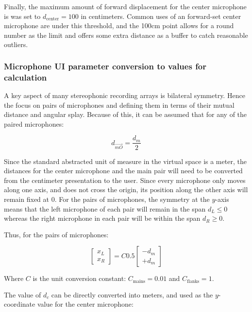 Finally, the maximum amount of forward displacement for the center microphone is was set to $d_\text{center} = 100$ in centimeters. Common uses of an forward-set center microphone are under this threshold, and the 100cm point allows for a round number as the limit and offers some extra distance as a buffer to catch reasonable outliers.

\subsubsection{Microphone UI parameter conversion to values for calculation}

A key aspect of many stereophonic recording arrays is bilateral symmetry. Hence the focus on pairs of microphones and defining them in terms of their mutual distance and angular splay. Because of this, it can be assumed that for any of the paired microphones:

\begin{equation}
	d_{\vec{mO}} = \frac{d_m}{2}
\end{equation}

Since the standard abstracted unit of measure in the virtual space is a meter, the distances for the center microphone and the main pair will need to be converted from the centimeter presentation to the user. Since every microphone only moves along one axis, and does not cross the origin, its position along the other axis will remain fixed at $0$. For the pairs of microphones, the symmetry at the $y$-axis means that the left microphone of each pair will remain in the span $d_L \leq 0$ whereas the right microphone in each pair will be within the span $d_R \geq 0$.

Thus, for the pairs of microphones:

\begin{equation}
	\begin{bmatrix} x_L \\ x_R \end{bmatrix} = C0.5 \begin{bmatrix} -d_m \\ +d_m \end{bmatrix}
\end{equation}

Where $C$ is the unit conversion constant: $C_\text{mains} = 0.01$ and $C_\text{flanks} = 1$.

The value of $d_c$ can be directly converted into meters, and used as the $y$-coordinate value for the center microphone:


